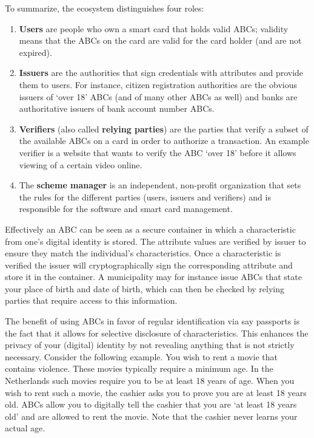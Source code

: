 To summarize, the ecosystem distinguishes four roles:
\begin{enumerate}
  \item \textbf{Users} are people who own a smart card that holds valid ABCs; validity means that the ABCs on the card are valid for the card holder (and are not expired).
  \item \textbf{Issuers} are the authorities that sign credentials with attributes and provide them to users. For  instance, citizen registration authorities are the obvious issuers of `over 18' ABCs (and of many other ABCs as well) and banks are authoritative issuers of bank account number ABCs.
  \item \textbf{Verifiers} (also called \textbf{relying parties}) are the parties that verify a subset of the available ABCs on a card in order to authorize a transaction. An example verifier is a website that wants to verify the ABC `over 18' before it allows viewing of a certain video online.
  \item The \textbf{scheme manager} is an independent, non-profit organization that sets the rules for the different parties (users, issuers and verifiers) and is responsible for the software and smart card management.
\end{enumerate}

Effectively an ABC can be seen as a secure container in which a characteristic from one's digital identity is stored. The attribute values are verified by issuer to ensure they match the individual's characteristics. Once a characteristic is verified the issuer will cryptographically sign the corresponding attribute and store it in the container. A municipality may for instance issue ABCs that state your place of birth and date of birth, which can then be checked by relying parties that require access to this information.

The benefit of using ABCs in favor of regular identification via say passports is the fact that it allows for selective disclosure of characteristics. This enhances the privacy of your (digital) identity by not revealing anything that is not strictly necessary. Consider the following example. You wish to rent a movie that contains violence. These movies typically require a minimum age. In the Netherlands such movies require you to be at least 18 years of age. When you wish to rent such a movie, the cashier asks you to prove you are at least 18 years old. ABCs allow you to digitally tell the cashier that you are `at least 18 years old' and are allowed to rent the movie. Note that the cashier never learns your actual age.

